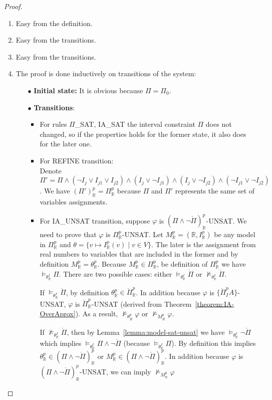 \begin{proof}   
\begin{enumerate}
\item Easy from the definition.
\item Easy from the transitions.
\item Easy from the transitions.
\item The proof is done inductively on transitions of the system:
\begin{itemize}
\item[$\bullet$] \sloppy \textbf{Initial state:} It is obvious because $\Pi = \Pi_0$.
\item[$\bullet$] \textbf{Transitions}:
\begin{itemize}
\item For rules $\Pi$\_SAT, IA\_SAT the interval constraint $\Pi$ does not changed, so if the properties holds for the former state, it also does for the later one.
\item \sloppy For REFINE transition: \\ Denote ${\Pi' = \Pi \wedge (\neg I_j \vee I_{j1} \vee I_{j2}) \wedge (I_j \vee \neg I_{j1}) \wedge (I_j \vee \neg I_{j2}) \wedge (\neg I_{j1} \vee \neg I_{j2})}$. We have $(\Pi')^p_\mathbb{R} = \Pi^p_\mathbb{R}$ because $\Pi$ and $\Pi'$ represents the same set of variables assignments. 
\item For IA\_UNSAT transition, suppose $\varphi$ is $(\Pi \wedge \neg\mathring{\Pi})^p_\mathbb{R}$-UNSAT. We need to prove that $\varphi$ is $\Pi^p_\mathbb{R}$-UNSAT. Let $M^p_\mathbb{R} = (\mathbb{R}, I^p_\mathbb{R})$ be any model in $\Pi^p_\mathbb{R}$ and $\theta = \{v \mapsto I^p_\mathbb{R}(v) \mid v \in V\}$. The later is the assignment from real numbers to variables that are included in the former and by definition $M^p_\mathbb{R} = \theta^p_\mathbb{R}$. Because $M^p_\mathbb{R} \in \Pi^p_\mathbb{R}$, be definition of $\Pi^p_\mathbb{R}$ we have $\models_{\theta^I_\mathbb{R}}\Pi$.
There are two possible cases: either $\models_{\theta^I_\mathbb{R}} \mathring{\Pi}$ or $\not\models_{\theta^I_\mathbb{R}} \mathring{\Pi}$.

If $\models_{\theta^I_\mathbb{R}} \mathring{\Pi}$, by definition $\theta^p_\mathbb{R} \in \mathring{\Pi}^p_\mathbb{R}$. In addition because $\varphi$ is $\{\mathring{\Pi}^p_IA\}$-UNSAT, $\varphi$ is $\mathring{\Pi}^p_\mathbb{R}$-UNSAT (derived from Theorem~\ref{theorem:IA-OverAprox}). As a result, $\not\models_{\theta^p_R}\varphi$ or $\not\models_{M^p_R}\varphi$.

If $\not\models_{\theta^I_\mathbb{R}} \mathring{\Pi}$, then by Lemma~\ref{lemma:model-sat-unsat} we have $\models_{\theta^I_\mathbb{R}} \neg\mathring{\Pi}$ which implies $\models_{\theta^I_\mathbb{R}} \Pi \wedge \neg\mathring{\Pi}$ (because $\models_{\theta^I_\mathbb{R}}\Pi$). By definition this implies $\theta^p_\mathbb{R} \in (\Pi \wedge \neg\mathring{\Pi})^p_\mathbb{R}$ or $M^p_\mathbb{R} \in (\Pi \wedge \neg\mathring{\Pi})^p_\mathbb{R}$. In addition because $\varphi$ is $(\Pi \wedge \neg\mathring{\Pi})^p_\mathbb{R}$-UNSAT, we can imply $\not\models_{M^p_\mathbb{R}}\varphi$


\end{itemize}
\end{itemize}
\end{enumerate}
\end{proof}

